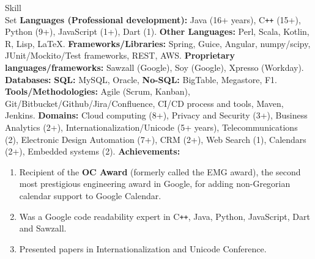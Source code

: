 \documentclass{resume}
\newcommand{\CC}{C{\tt ++}}
\begin{document}
\iftrue
\begin{category}{Skill \\ Set}
  \citembullet \textbf{Languages (Professional development):} Java (16+ years), \CC{} (15+), Python (9+), JavaScript (1+), Dart (1).
  \citembullet \textbf{Other Languages:} Perl, Scala, Kotlin, R, Lisp, \LaTeX.
  \citembullet \textbf{Frameworks/Libraries:} Spring, Guice, 
  Angular, numpy/scipy, JUnit/Mockito/Test frameworks, REST, AWS.
  \citembullet \textbf{Proprietary languages/frameworks:} Sawzall (Google), Soy (Google), Xpresso (Workday).
  \citembullet \textbf{Databases:} \textbf{SQL:} MySQL, Oracle, \textbf{No-SQL:} BigTable, Megastore, F1.
  \citembullet \textbf{Tools/Methodologies:} Agile (Scrum, Kanban),
  Git/Bitbucket/Github/Jira/Confluence, CI/CD process and tools,
  Maven, Jenkins.
  \citembullet \textbf{Domains:} Cloud computing (8+), Privacy and Security (3+), Business Analytics (2+), Internationalization/Unicode (5+ years),
  Telecommunications (2), Electronic Design Automation (7+), CRM (2+), Web Search (1), Calendars (2+), Embedded systems (2).
  \citembullet \textbf{Achievements:}   \begin{enumerate}
  \item Recipient of the \textbf{OC Award} (formerly called the EMG award), the second most prestigious engineering award in Google, for adding non-Gregorian calendar support to Google Calendar.  
  \item Was a Google code readability expert in \CC{}, Java, Python, JavaScript, Dart and Sawzall.
  \item Presented papers in Internationalization and Unicode Conference.
  \end{enumerate}
\end{category}
\fi

\end{document}
